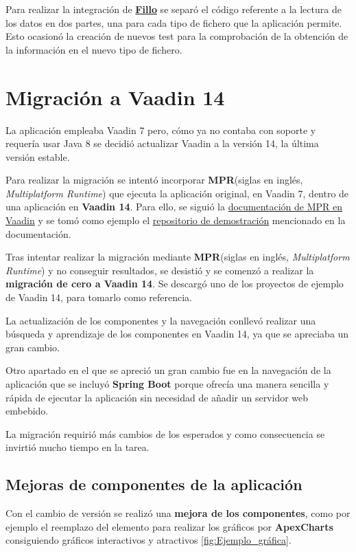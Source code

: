 Para realizar la integración de \textbf{\href{https://codoid.com/fillo/}{Fillo}} se separó el código referente a la lectura de los datos en dos partes, una para cada tipo de fichero que la aplicación permite. Esto ocasionó la creación de nuevos test para la comprobación de la obtención de la información en el nuevo tipo de fichero.

\section{Migración a Vaadin 14}
La aplicación empleaba Vaadin 7 pero, cómo ya no contaba con soporte y requería usar Java 8 se decidió actualizar Vaadin a la versión 14, la última versión estable.  

Para realizar la migración se intentó incorporar \textbf{MPR}(siglas en inglés, \emph{Multiplatform Runtime}) que ejecuta la aplicación original, en Vaadin 7, dentro de una aplicación en \textbf{Vaadin 14}. Para ello, se siguió la \href{https://vaadin.com/docs/v14/tools/mpr/introduction/step-1-maven-v7}{documentación de MPR en Vaadin} y se tomó como ejemplo el \href{https://github.com/OlliTietavainenVaadin/mpr-demo/tree/v7}{repositorio de demostración} mencionado en la documentación.

Tras intentar realizar la migración mediante \textbf{MPR}(siglas en inglés, \emph{Multiplatform Runtime}) y no conseguir resultados, se desistió y se comenzó a realizar la \textbf{migración de cero a Vaadin 14}. Se descargó uno de los proyectos de ejemplo de Vaadin 14, para tomarlo como referencia. 

La actualización de los componentes y la navegación conllevó realizar una búsqueda y aprendizaje de los componentes en Vaadin 14, ya que se apreciaba un gran cambio.

Otro apartado en el que se apreció un gran cambio fue en la navegación de la aplicación que se incluyó \textbf{Spring Boot} porque ofrecía una manera sencilla y rápida de ejecutar la aplicación sin necesidad de añadir un servidor web embebido.

La migración requirió más cambios de los esperados y como consecuencia se invirtió mucho tiempo en la tarea.

\subsection{Mejoras de componentes de la aplicación}
Con el cambio de versión se realizó una \textbf{mejora de los componentes}, como por ejemplo el reemplazo del elemento para realizar los gráficos por \textbf{ApexCharts} consiguiendo gráficos interactivos y atractivos \ref{fig:Ejemplo_gráfica}.

